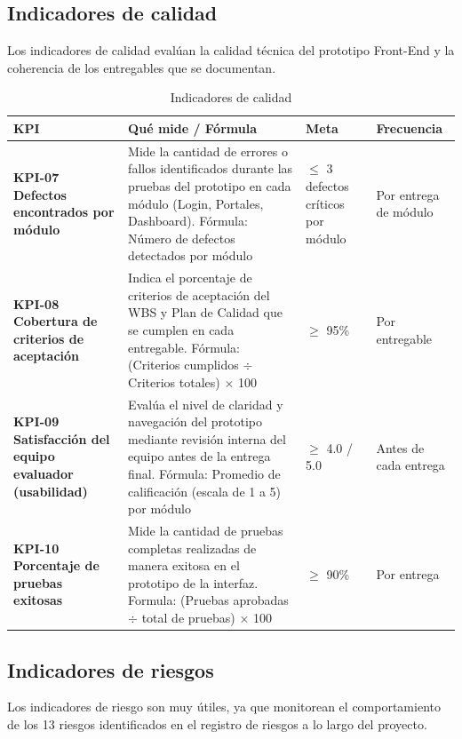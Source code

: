 \documentclass[11pt,spanish]{article}
\begin{document}
\subsection{Indicadores de calidad}

Los indicadores de calidad evalúan la calidad técnica del prototipo Front-End y la coherencia de los entregables que se documentan.

\begin{table}[H]
\centering
\small
\caption{Indicadores de calidad}\label{tab:indicadores-calidad}
\begin{tabularx}{\textwidth}{p{4.5cm} Y p{3cm} p{2.5cm}}
\toprule
\textbf{KPI} & \textbf{Qué mide / Fórmula} & \textbf{Meta} & \textbf{Frecuencia} \\
\midrule
\textbf{KPI-07 Defectos encontrados por módulo} & Mide la cantidad de errores o fallos identificados durante las pruebas del prototipo en cada módulo (Login, Portales, Dashboard). Fórmula: Número de defectos detectados por módulo & $\leq$ 3 defectos críticos por módulo & Por entrega de módulo \\
\textbf{KPI-08 Cobertura de criterios de aceptación} & Indica el porcentaje de criterios de aceptación del WBS y Plan de Calidad que se cumplen en cada entregable. Fórmula: (Criterios cumplidos $\div$ Criterios totales) $\times$ 100 & $\geq$ 95\% & Por entregable \\
\textbf{KPI-09 Satisfacción del equipo evaluador (usabilidad)} & Evalúa el nivel de claridad y navegación del prototipo mediante revisión interna del equipo antes de la entrega final. Fórmula: Promedio de calificación (escala de 1 a 5) por módulo & $\geq$ 4.0 / 5.0 & Antes de cada entrega \\
\textbf{KPI-10 Porcentaje de pruebas exitosas} & Mide la cantidad de pruebas completas realizadas de manera exitosa en el prototipo de la interfaz. Formula: (Pruebas aprobadas $\div$ total de pruebas) $\times$ 100 & $\geq$ 90\% & Por entrega \\
\bottomrule
\end{tabularx}
\end{table}

\subsection{Indicadores de riesgos}

Los indicadores de riesgo son muy útiles, ya que monitorean el comportamiento de los 13 riesgos identificados en el registro de riesgos a lo largo del proyecto.
\end{document}
